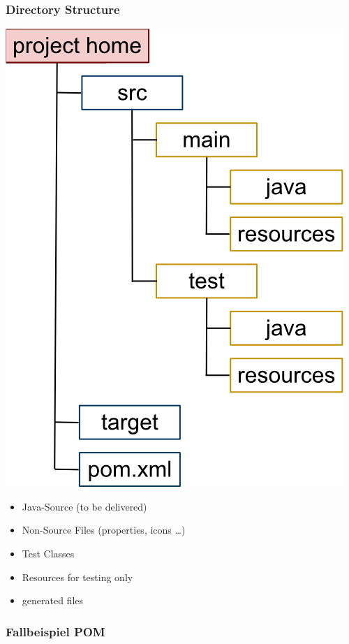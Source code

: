 \documentclass[10pt]{article}
\begin{document}
    \subsubsection{Directory Structure}
    \begin{multicols}{2}
    	\includegraphics[scale=0.5]{assets/mvn_directory_structure.png}
    	\begin{itemize}
			\item Java-Source (to be delivered)
			\item Non-Source Files (properties, icons …)
			\item Test Classes
			\item Resources for testing only
			\item generated files
		\end{itemize}
    \end{multicols}
				
	\newpage
    \subsubsection{Fallbeispiel POM}
    
	\newpage
	
\end{document}
